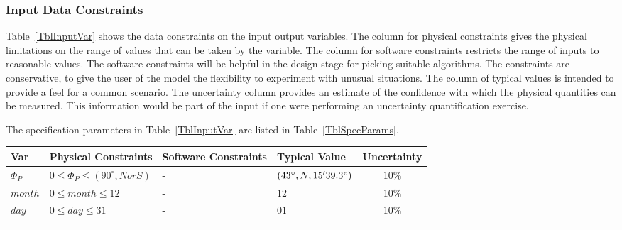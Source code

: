 \documentclass[12pt]{article}
\begin{document}

\subsubsection{Input Data Constraints} \label{sec_DataConstraints}    

Table~\ref{TblInputVar} shows the data constraints on the input output
variables.  The column for physical constraints gives the physical limitations
on the range of values that can be taken by the variable.  The column for
software constraints restricts the range of inputs to reasonable values.  The
software constraints will be helpful in the design stage for picking suitable
algorithms.  The constraints are conservative, to give the user of the model the
flexibility to experiment with unusual situations.  The column of typical values
is intended to provide a feel for a common scenario.  The uncertainty column
provides an estimate of the confidence with which the physical quantities can be
measured.  This information would be part of the input if one were performing an
uncertainty quantification exercise.

The specification parameters in Table~\ref{TblInputVar} are listed in
Table~\ref{TblSpecParams}.

\begin{table}[!h]
  \caption{Input Variables} \label{TblInputVar}
  \renewcommand{\arraystretch}{1.2}
\noindent \begin{longtable*}{l l l l c} 
  \toprule
  \textbf{Var} & \textbf{Physical Constraints} & \textbf{Software Constraints} &
                             \textbf{Typical Value} & \textbf{Uncertainty}\\
  \midrule 
  $\Phi_P$ & $0 \leq \Phi_P \leq (90^\circ,  N or S)$ & $\text{-}$ & {$(43^\circ, N, 15'39.3")$} & 10\%\\
  $month$ & $0 \leq month \leq 12$ & $\text{-}$ & $12$& 10\%\\
  $day$ & $0 \leq day \leq 31$ & $\text{-}$ & $01$ & 10\%\\
  \\
  \bottomrule
\end{longtable*}
\end{table}

\noindent 

\end{document}
